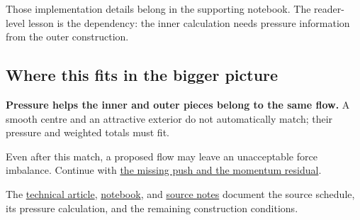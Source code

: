 \documentclass[
  english,
  11pt,
]{article}
\begin{document}
Those implementation details belong in the supporting notebook. The
reader-level lesson is the dependency: the inner calculation needs
pressure information from the outer construction.

\subsection{Where this fits in the bigger
picture}\label{where-this-fits-in-the-bigger-picture}

\textbf{Pressure helps the inner and outer pieces belong to the same
flow.} A smooth centre and an attractive exterior do not automatically
match; their pressure and weighted totals must fit.

Even after this match, a proposed flow may leave an unacceptable force
imbalance. Continue with \href{../d3_residual/article.html}{the missing
push and the momentum residual}.

The \href{technical-article.html}{technical article},
\href{../../code/d6_axis_pressure/study.ipynb}{notebook}, and
\href{source-notes.md}{source notes} document the source schedule, its
pressure calculation, and the remaining construction conditions.
\end{document}
